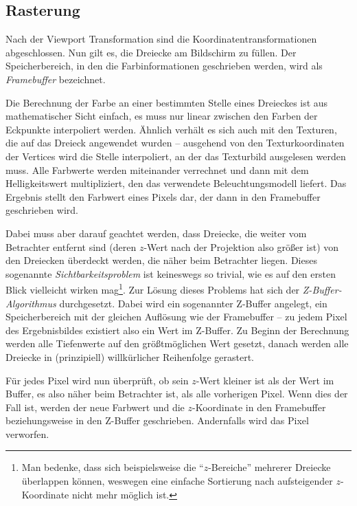 \subsection{Rasterung}
Nach der Viewport Transformation sind die Koordinatentransformationen abgeschlossen. Nun gilt es, die Dreiecke am Bildschirm zu füllen. Der Speicherbereich, in den die Farbinformationen geschrieben werden, wird als \emph{Framebuffer} bezeichnet.

\label{lighting}
Die Berechnung der Farbe an einer bestimmten Stelle eines Dreieckes ist aus mathematischer Sicht einfach, es muss nur linear zwischen den Farben der Eckpunkte interpoliert werden. Ähnlich verhält es sich auch mit den Texturen, die auf das Dreieck angewendet wurden -- ausgehend von den Texturkoordinaten der Vertices wird die Stelle interpoliert, an der das Texturbild ausgelesen werden muss. Alle Farbwerte werden miteinander verrechnet und dann mit dem Helligkeitswert multipliziert, den das verwendete Beleuchtungsmodell liefert. Das Ergebnis stellt den Farbwert eines Pixels dar, der dann in den Framebuffer geschrieben wird.


Dabei muss aber darauf geachtet werden, dass Dreiecke, die weiter vom Betrachter entfernt sind (deren $z$-Wert nach der Projektion also größer ist) von den Dreiecken überdeckt werden, die näher beim Betrachter liegen. Dieses sogenannte \emph{Sichtbarkeitsproblem} ist keineswegs so trivial, wie es auf den ersten Blick vielleicht wirken mag\footnote{Man bedenke, dass sich beispielsweise die \enquote{$z$-Bereiche} mehrerer Dreiecke überlappen können, weswegen eine einfache Sortierung nach aufsteigender $z$-Koordinate nicht mehr möglich ist.}. Zur Lösung dieses Problems hat sich der \emph{Z-Buffer-Algorithmus} durchgesetzt. Dabei wird ein sogenannter Z-Buffer angelegt, ein Speicherbereich mit der gleichen Auflösung wie der Framebuffer -- zu jedem Pixel des Ergebnisbildes existiert also ein Wert im Z-Buffer. Zu Beginn der Berechnung werden alle Tiefenwerte auf den größtmöglichen Wert gesetzt, danach werden alle Dreiecke in (prinzipiell) willkürlicher Reihenfolge gerastert.

Für jedes Pixel wird nun überprüft, ob sein $z$-Wert kleiner ist als der Wert im Buffer, es also näher beim Betrachter ist, als alle vorherigen Pixel. Wenn dies der Fall ist, werden der neue Farbwert und die $z$-Koordinate in den Framebuffer beziehungsweise in den Z-Buffer geschrieben. Andernfalls wird das Pixel verworfen.

